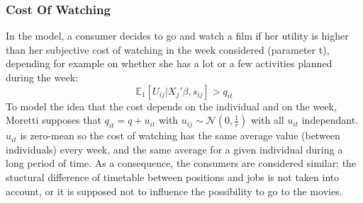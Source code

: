 	\subsubsection{Cost Of Watching}
	In the model, a consumer decides to go and watch a film if her utility is higher than her subjective cost of watching in the week considered (parameter t), depending for example on whether she has a lot or a few activities planned during the week: 
	\begin{equation}
	\mathbb{E}_1[U_{i j}|X_{j}'\beta, s_{i j}]>q_{i t}
	\end{equation}
	To model the idea that the cost depends on the individual and on the week, Moretti supposes that $q_{i t}=q+u_{i t}$ with $u_{i j}\sim \mathcal{N}(0,\frac{1}{r})$ with all $u_{i t}$ independant. $u_{i t}$ is zero-mean so the cost of watching has the same average value (between individuals) every week, and the same average for a given individual during a long period of time. As a consequence, the consumers are considered similar; the stuctural difference of timetable between positions and jobs is not taken into account, or it is supposed not to influence the possibility to go to the movies.\\
	\\

